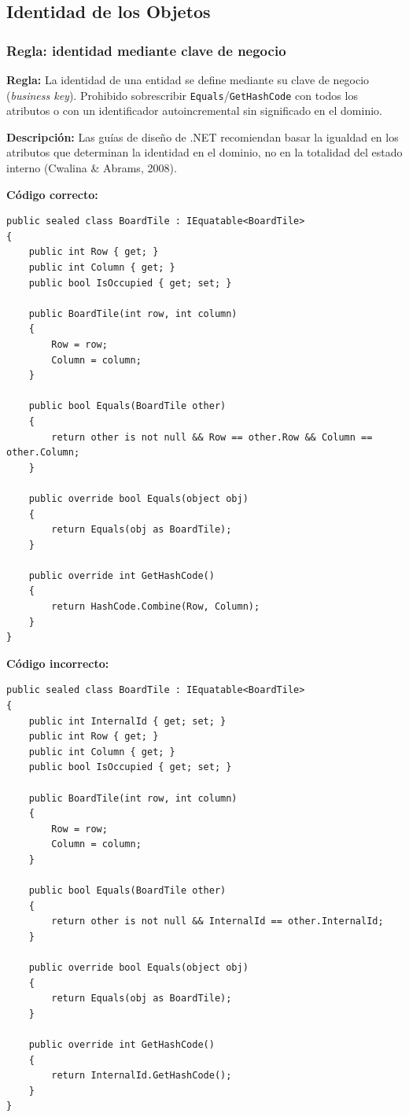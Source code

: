 \subsection{Identidad de los Objetos}

\subsubsection{Regla: identidad mediante clave de negocio}

\textbf{Regla:} La identidad de una entidad se define mediante su clave de negocio (\emph{business key}). Prohibido sobrescribir \texttt{Equals}/\texttt{GetHashCode} con todos los atributos o con un identificador autoincremental sin significado en el dominio.

\textbf{Descripción:} Las guías de diseño de .NET recomiendan basar la igualdad en los atributos que determinan la identidad en el dominio, no en la totalidad del estado interno (Cwalina \& Abrams, 2008).

\textbf{Código correcto:}
\begin{lstlisting}[style=csharpstyle]
public sealed class BoardTile : IEquatable<BoardTile>
{
    public int Row { get; }
    public int Column { get; }
    public bool IsOccupied { get; set; }

    public BoardTile(int row, int column)
    {
        Row = row;
        Column = column;
    }

    public bool Equals(BoardTile other)
    {
        return other is not null && Row == other.Row && Column == other.Column;
    }

    public override bool Equals(object obj)
    {
        return Equals(obj as BoardTile);
    }

    public override int GetHashCode()
    {
        return HashCode.Combine(Row, Column);
    }
}
\end{lstlisting}

\textbf{Código incorrecto:}
\begin{lstlisting}[style=csharpstyle]
public sealed class BoardTile : IEquatable<BoardTile>
{
    public int InternalId { get; set; }
    public int Row { get; }
    public int Column { get; }
    public bool IsOccupied { get; set; }

    public BoardTile(int row, int column)
    {
        Row = row;
        Column = column;
    }

    public bool Equals(BoardTile other)
    {
        return other is not null && InternalId == other.InternalId;
    }

    public override bool Equals(object obj)
    {
        return Equals(obj as BoardTile);
    }

    public override int GetHashCode()
    {
        return InternalId.GetHashCode();
    }
}
\end{lstlisting}
